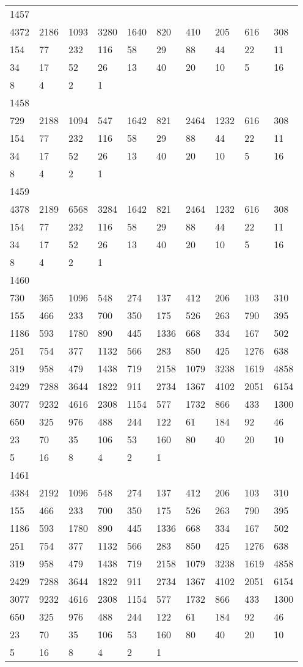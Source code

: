 \begin{longtable}{*{10}{l}}
1457&&&&&&&&&\\
4372& 2186& 1093& 3280& 1640& 820& 410& 205& 616& 308\\
154& 77& 232& 116& 58& 29& 88& 44& 22& 11\\
34& 17& 52& 26& 13& 40& 20& 10& 5& 16\\
8& 4& 2& 1& \\

1458&&&&&&&&&\\
729& 2188& 1094& 547& 1642& 821& 2464& 1232& 616& 308\\
154& 77& 232& 116& 58& 29& 88& 44& 22& 11\\
34& 17& 52& 26& 13& 40& 20& 10& 5& 16\\
8& 4& 2& 1& \\

1459&&&&&&&&&\\
4378& 2189& 6568& 3284& 1642& 821& 2464& 1232& 616& 308\\
154& 77& 232& 116& 58& 29& 88& 44& 22& 11\\
34& 17& 52& 26& 13& 40& 20& 10& 5& 16\\
8& 4& 2& 1& \\

1460&&&&&&&&&\\
730& 365& 1096& 548& 274& 137& 412& 206& 103& 310\\
155& 466& 233& 700& 350& 175& 526& 263& 790& 395\\
1186& 593& 1780& 890& 445& 1336& 668& 334& 167& 502\\
251& 754& 377& 1132& 566& 283& 850& 425& 1276& 638\\
319& 958& 479& 1438& 719& 2158& 1079& 3238& 1619& 4858\\
2429& 7288& 3644& 1822& 911& 2734& 1367& 4102& 2051& 6154\\
3077& 9232& 4616& 2308& 1154& 577& 1732& 866& 433& 1300\\
650& 325& 976& 488& 244& 122& 61& 184& 92& 46\\
23& 70& 35& 106& 53& 160& 80& 40& 20& 10\\
5& 16& 8& 4& 2& 1& \\

1461&&&&&&&&&\\
4384& 2192& 1096& 548& 274& 137& 412& 206& 103& 310\\
155& 466& 233& 700& 350& 175& 526& 263& 790& 395\\
1186& 593& 1780& 890& 445& 1336& 668& 334& 167& 502\\
251& 754& 377& 1132& 566& 283& 850& 425& 1276& 638\\
319& 958& 479& 1438& 719& 2158& 1079& 3238& 1619& 4858\\
2429& 7288& 3644& 1822& 911& 2734& 1367& 4102& 2051& 6154\\
3077& 9232& 4616& 2308& 1154& 577& 1732& 866& 433& 1300\\
650& 325& 976& 488& 244& 122& 61& 184& 92& 46\\
23& 70& 35& 106& 53& 160& 80& 40& 20& 10\\
5& 16& 8& 4& 2& 1& \\


\end{longtable}
